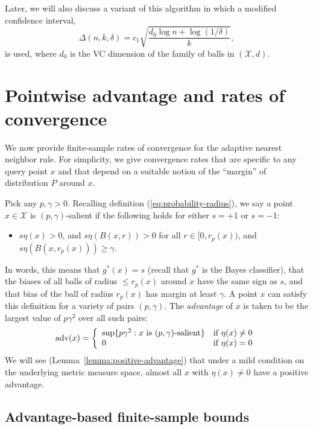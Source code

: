 \documentclass{article}
\def\X{{\mathcal X}}
\def\adv{{\rm adv}}
\begin{document}
Later, we will also discuss a variant of this algorithm in which a modified confidence interval,
\begin{equation}
\Delta(n,k,\delta) = c_1 \sqrt{\frac{d_0 \log n + \log (1/\delta)}{k}},
\label{eq:delta-modified}
\end{equation}
is used, where $d_0$ is the VC dimension of the family of balls in $(\X,d)$. 

\section{Pointwise advantage and rates of convergence}\label{sec:gen1}

We now provide finite-sample rates of convergence for the adaptive nearest neighbor rule. For simplicity, we give convergence rates that are specific to any query point $x$ and that depend on a suitable notion of the ``margin'' of distribution $P$ around $x$.

Pick any $p, \gamma > 0$. Recalling definition
(\ref{eq:probability-radius}), we say a point $x \in \X$ is $(p,
\gamma)$-salient
if the following holds for either $s=+1$ or $s=-1$:
\begin{itemize}
\item $s \eta(x) > 0$, and $s \eta(B(x,r)) > 0$ for all $r \in
  [0,r_p(x))$, and $s \eta(B(x,r_p(x))) \geq \gamma$.
\end{itemize}
In words, this means that $g^*(x)=s$ (recall that $g^*$ is the Bayes classifier),
that the biases of all balls of radius $\leq r_p(x)$ around $x$ have the same sign as $s$, and that
bias of the ball of radius $r_p(x)$ has margin at least $\gamma$.
A point $x$ can satisfy this definition for a variety of pairs $(p,\gamma)$. The {\it advantage} of $x$ is taken to be the largest value of $p\gamma^2$ over all such pairs:
\begin{equation}
\adv(x) = 
\left\{
\begin{array}{ll}
\sup \{ p \gamma^2: \mbox{$x$ is $(p,\gamma)$-salient}\} & \mbox{if $\eta(x) \neq 0$} \\
0 & \mbox{if $\eta(x) = 0$}
\end{array}
\right.
\label{eq:advantage}
\end{equation}
We will see (Lemma~\ref{lemma:positive-advantage}) that under a mild condition on the underlying metric measure space, almost all $x$ with $\eta(x) \neq 0$ have a positive advantage.

\subsection{Advantage-based finite-sample bounds}
\end{document}
